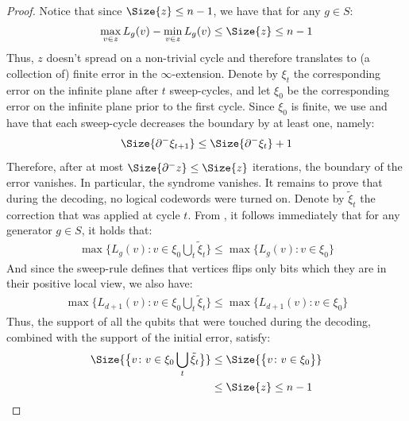\begin{proof}
  Notice that since $\Size{z}\le n-1$, we have that for any $g \in S$:
  \begin{equation*}
    \begin{split}
      \max_{v \in z }L_{g}(v) -  \min_{v \in z }L_{g}(v) \le \Size{z} \le n-1
    \end{split}
  \end{equation*}
Thus, $z$ doesn't spread on a non-trivial cycle and therefore translates to (a collection of) finite error in the $\infty$-extension. Denote by $\xi_{t}$ the corresponding error on the infinite plane after $t$ sweep-cycles, and let $\xi_{0}$ be the corresponding error on the infinite plane prior to the first cycle. Since $\xi_{0}$ is finite, we use  and have that each sweep-cycle decreases the boundary by at least one, namely:
  \begin{equation*}
    \begin{split}
      \Size{\partial^{-}\xi_{t+1}} \le \Size{\partial^{-}\xi_{t}} + 1
    \end{split}
  \end{equation*}
  Therefore, after at most $\Size{\partial^{-} z} \le \Size{z}$ iterations, the boundary of the error vanishes. In particular, the syndrome vanishes. It remains to prove that during the decoding, no logical codewords were turned on. Denote by $\tilde{\xi}_{t}$ the correction that was applied at cycle $t$. From , it follows immediately that for any generator $g \in S$, it holds that:
  \begin{equation*}
    \begin{split}
      \max \bigl\{ L_{g}(v) : v \in  \xi_{0}  \bigcup_{t} \tilde{\xi}_{t} \bigr\} \le  \max \bigl\{ L_{g}(v) : v \in  \xi_{0} \bigr\} 
    \end{split}
  \end{equation*}
  And since the sweep-rule defines that vertices flips only bits which they are in their positive local view, we also have: 
  \begin{equation*}
    \begin{split}
      \max \bigl\{ L_{d+1}(v) : v \in  \xi_{0}  \bigcup_{t} \tilde{\xi}_{t} \bigr\} \le  \max \bigl\{ L_{d+1}(v) : v \in  \xi_{0} \bigr\} 
    \end{split}
  \end{equation*}
Thus, the support of all the qubits that were touched during the decoding, combined with the support of the initial error, satisfy:
  \begin{equation*}
    \begin{split}
      \Size{ \bigl\{ v \colon v \in  \xi_{0}  \bigcup_{t}\tilde{\xi}_{t} \bigr\} }  & \le \Size{ \bigl\{ v \colon v \in  \xi_{0}  \bigr\} } \\ 
      & \le \Size{ z } \le n-1 
    \end{split}
  \end{equation*}
\end{proof}


